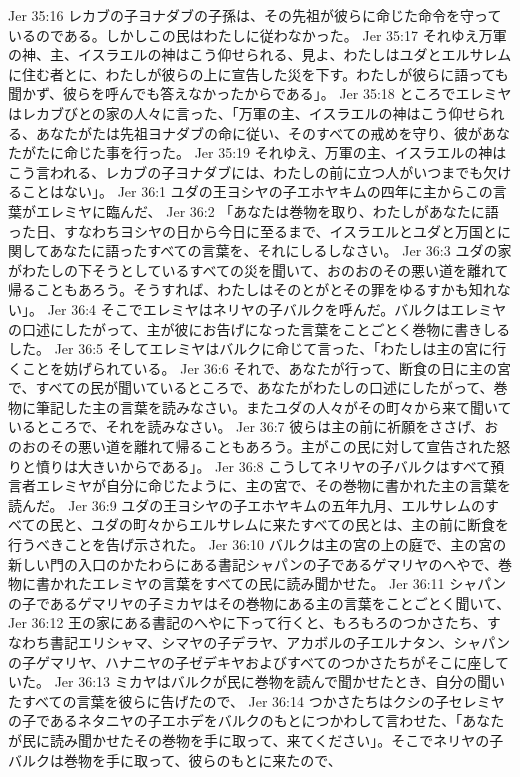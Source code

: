 Jer 35:16  レカブの子ヨナダブの子孫は、その先祖が彼らに命じた命令を守っているのである。しかしこの民はわたしに従わなかった。
Jer 35:17  それゆえ万軍の神、主、イスラエルの神はこう仰せられる、見よ、わたしはユダとエルサレムに住む者とに、わたしが彼らの上に宣告した災を下す。わたしが彼らに語っても聞かず、彼らを呼んでも答えなかったからである」。
Jer 35:18  ところでエレミヤはレカブびとの家の人々に言った、「万軍の主、イスラエルの神はこう仰せられる、あなたがたは先祖ヨナダブの命に従い、そのすべての戒めを守り、彼があなたがたに命じた事を行った。
Jer 35:19  それゆえ、万軍の主、イスラエルの神はこう言われる、レカブの子ヨナダブには、わたしの前に立つ人がいつまでも欠けることはない」。
Jer 36:1  ユダの王ヨシヤの子エホヤキムの四年に主からこの言葉がエレミヤに臨んだ、
Jer 36:2  「あなたは巻物を取り、わたしがあなたに語った日、すなわちヨシヤの日から今日に至るまで、イスラエルとユダと万国とに関してあなたに語ったすべての言葉を、それにしるしなさい。
Jer 36:3  ユダの家がわたしの下そうとしているすべての災を聞いて、おのおのその悪い道を離れて帰ることもあろう。そうすれば、わたしはそのとがとその罪をゆるすかも知れない」。
Jer 36:4  そこでエレミヤはネリヤの子バルクを呼んだ。バルクはエレミヤの口述にしたがって、主が彼にお告げになった言葉をことごとく巻物に書きしるした。
Jer 36:5  そしてエレミヤはバルクに命じて言った、「わたしは主の宮に行くことを妨げられている。
Jer 36:6  それで、あなたが行って、断食の日に主の宮で、すべての民が聞いているところで、あなたがわたしの口述にしたがって、巻物に筆記した主の言葉を読みなさい。またユダの人々がその町々から来て聞いているところで、それを読みなさい。
Jer 36:7  彼らは主の前に祈願をささげ、おのおのその悪い道を離れて帰ることもあろう。主がこの民に対して宣告された怒りと憤りは大きいからである」。
Jer 36:8  こうしてネリヤの子バルクはすべて預言者エレミヤが自分に命じたように、主の宮で、その巻物に書かれた主の言葉を読んだ。
Jer 36:9  ユダの王ヨシヤの子エホヤキムの五年九月、エルサレムのすべての民と、ユダの町々からエルサレムに来たすべての民とは、主の前に断食を行うべきことを告げ示された。
Jer 36:10  バルクは主の宮の上の庭で、主の宮の新しい門の入口のかたわらにある書記シャパンの子であるゲマリヤのへやで、巻物に書かれたエレミヤの言葉をすべての民に読み聞かせた。
Jer 36:11  シャパンの子であるゲマリヤの子ミカヤはその巻物にある主の言葉をことごとく聞いて、
Jer 36:12  王の家にある書記のへやに下って行くと、もろもろのつかさたち、すなわち書記エリシャマ、シマヤの子デラヤ、アカボルの子エルナタン、シャパンの子ゲマリヤ、ハナニヤの子ゼデキヤおよびすべてのつかさたちがそこに座していた。
Jer 36:13  ミカヤはバルクが民に巻物を読んで聞かせたとき、自分の聞いたすべての言葉を彼らに告げたので、
Jer 36:14  つかさたちはクシの子セレミヤの子であるネタニヤの子エホデをバルクのもとにつかわして言わせた、「あなたが民に読み聞かせたその巻物を手に取って、来てください」。そこでネリヤの子バルクは巻物を手に取って、彼らのもとに来たので、
